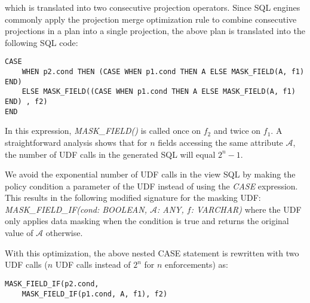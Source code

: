 which is translated into two consecutive projection operators. Since SQL engines commonly apply the projection merge optimization rule to combine consecutive projections in a plan into a single projection,
the above plan is translated into the following SQL code:
\begin{lstlisting} 
CASE
    WHEN p2.cond THEN (CASE WHEN p1.cond THEN A ELSE MASK_FIELD(A, f1) END) 
    ELSE MASK_FIELD((CASE WHEN p1.cond THEN A ELSE MASK_FIELD(A, f1) END) , f2)
END
\end{lstlisting}
In this expression, \emph{MASK\_FIELD()} is called once on $f_2$ and twice on $f_1$. A straightforward analysis shows that for $n$ fields accessing the same attribute $\mathcal{A}$, the number of UDF calls in the generated SQL will equal $2^n - 1$. 


We avoid the exponential number of UDF calls in the view SQL by making the policy condition a parameter of the UDF instead of using the \emph{CASE} expression. This results in the following modified signature for the masking UDF: \\
\emph{MASK\_FIELD\_IF(cond: BOOLEAN, $\mathcal{A}$: ANY, $f$: VARCHAR)}
where the UDF only applies data masking when the condition is true and returns the original value of $\mathcal{A}$ otherwise.

With this optimization, the above nested CASE statement is rewritten with two UDF calls ($n$ UDF calls instead of $2^n$ for $n$ enforcements) as:
\begin{lstlisting} 
MASK_FIELD_IF(p2.cond, 
    MASK_FIELD_IF(p1.cond, A, f1), f2)
\end{lstlisting}

